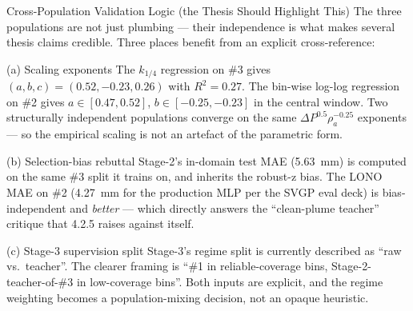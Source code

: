 \documentclass[UTF8,aspectratio=169]{ctexbeamer}
\newcommand{\good}[1]{\textcolor{green!45!black}{#1}}
\begin{document}
\begin{frame}{Cross-Population Validation Logic (the Thesis Should Highlight This)}
\small
The three populations are not just plumbing --- their independence is what makes several thesis claims credible. Three places benefit from an explicit cross-reference:

\vspace{0.45em}
\begin{block}{(a) Scaling exponents}
The \(k_{1/4}\) regression on \#3 gives \((a, b, c) = (0.52, -0.23, 0.26)\) with \(R^2 = 0.27\). The bin-wise log-log regression on \#2 gives \(a \in [0.47, 0.52]\), \(b \in [-0.25, -0.23]\) in the central window. \good{Two structurally independent populations converge on the same \(\Delta P^{0.5} \rho_a^{-0.25}\) exponents} --- so the empirical scaling is not an artefact of the parametric form.
\end{block}

\begin{block}{(b) Selection-bias rebuttal}
Stage-2's in-domain test MAE (\SI{5.63}{mm}) is computed on the same \#3 split it trains on, and inherits the robust-z bias. The LONO MAE on \#2 (\SI{4.27}{mm} for the production MLP per the SVGP eval deck) is bias-independent and \emph{better} --- which directly answers the ``clean-plume teacher'' critique that 4.2.5 raises against itself.
\end{block}

\begin{block}{(c) Stage-3 supervision split}
Stage-3's regime split is currently described as ``raw vs.\ teacher''. The clearer framing is ``\#1 in reliable-coverage bins, Stage-2-teacher-of-\#3 in low-coverage bins''. Both inputs are explicit, and the regime weighting becomes a population-mixing decision, not an opaque heuristic.
\end{block}
\end{frame}
\end{document}
